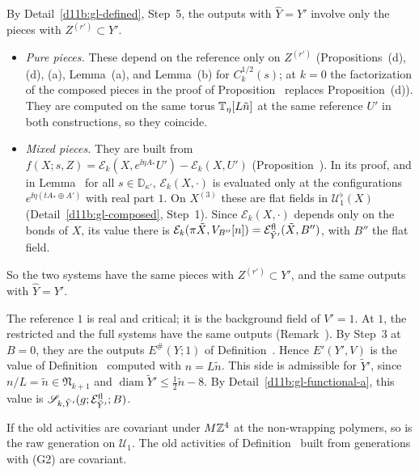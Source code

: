 \begin{step}
By Detail~\ref{d11b:gl-defined}, Step~5, the outputs with $\hat Y=Y'$ involve only the pieces with $Z^{(r')}\subset Y'$.
\begin{itemize}
\item \emph{Pure pieces.} These depend on the reference only on $Z^{(r')}$ (Propositions~(d), (d), (a), Lemma~(a), and Lemma~(b) for $C^{1/2}_k(s)$; at $k=0$ the factorization of the composed pieces in the proof of Proposition~ replaces Proposition~(d)). They are computed on the same torus $\mathbb T_\eta[L\tilde n]$ at the same reference $U'$ in both constructions, so they coincide.
\item \emph{Mixed pieces.} They are built from $f(X;s,Z)=\mathcal E_k(X,e^{\ii\eta A_*}U')-\mathcal E_k(X,U')$ (Proposition~). In its proof, and in Lemma~ for all $s\in\mathbb D_{\kappa'}$, $\mathcal E_k(X,\cdot)$ is evaluated only at the configurations $e^{\ii\eta(tA_*\oplus A')}$ with real part $1$. On $X^{(3)}$ these are flat fields in $\mathcal U^\flat_1(X)$ (Detail~\ref{d11b:gl-composed}, Step~1). Since $\mathcal E_k(X,\cdot)$ depends only on the bonds of $X$, its value there is $\mathcal E_k(\pi\tilde X,V_{B''}[n])=\mathcal E^{\rm fl}_{\tilde Y'}(\tilde X,B'')$, with $B''$ the flat field.
\end{itemize}
So the two systems have the same pieces with $Z^{(r')}\subset Y'$, and the same outputs with $\hat Y=Y'$.
\end{step}

\begin{step}
The reference $1$ is real and critical; it is the background field of $V'=1$. At $1$, the restricted and the full systems have the same outputs (Remark~). By Step~3 at $B=0$, they are the outputs $E^\#(Y;1)$ of Definition~. Hence $E'(Y',V)$ is the value of Definition~ computed with $n=L\tilde n$. This side is admissible for $\tilde Y'$, since $n/L=\tilde n\in\mathfrak N_{k+1}$ and $\operatorname{diam}\tilde Y'\le\frac12\tilde n-8$. By Detail~\ref{d11b:gl-functional-a}, this value is $\mathscr S_{k,\tilde Y'}(g;\mathcal E^{\rm fl}_{\tilde Y'};B)$.
\end{step}

\begin{detail}\label{d11b:gl-functional-d}
If the old activities are covariant under $M\mathbb Z^4$ at the non-wrapping polymers, so is the raw generation on $\mathcal U_1$. The old activities of Definition~ built from generations with (G2) are covariant.
\end{detail}

